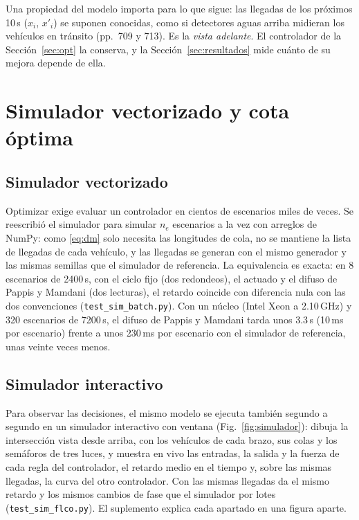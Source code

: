 \documentclass[journal]{IEEEtran}
\begin{document}
Una propiedad del modelo importa para lo que sigue: las llegadas de los próximos 10\,s ($x_i$, $x'_i$) se suponen conocidas, como si detectores aguas arriba midieran los vehículos en tránsito (pp.~709 y 713). Es la \emph{vista adelante}. El controlador de la Sección~\ref{sec:opt} la conserva, y la Sección~\ref{sec:resultados} mide cuánto de su mejora depende de ella.

\section{Simulador vectorizado y cota óptima}
\label{sec:simulador}

\subsection{Simulador vectorizado}
\label{sec:vectorizado}
Optimizar exige evaluar un controlador en cientos de escenarios miles de veces. Se reescribió el simulador para simular $n_e$ escenarios a la vez con arreglos de NumPy: como \eqref{eq:dm} solo necesita las longitudes de cola, no se mantiene la lista de llegadas de cada vehículo, y las llegadas se generan con el mismo generador y las mismas semillas que el simulador de referencia. La equivalencia es exacta: en 8 escenarios de 2400\,s, con el ciclo fijo (dos redondeos), el actuado y el difuso de Pappis y Mamdani (dos lecturas), el retardo coincide con diferencia nula con las dos convenciones (\texttt{test\_sim\_batch.py}). Con un núcleo (Intel Xeon a 2.10\,GHz) y 320 escenarios de 7200\,s, el difuso de Pappis y Mamdani tarda unos 3.3\,s (10\,ms por escenario) frente a unos 230\,ms por escenario con el simulador de referencia, unas veinte veces menos.


\subsection{Simulador interactivo}
\label{sec:interactivo}
Para observar las decisiones, el mismo modelo se ejecuta también segundo a segundo en un simulador interactivo con ventana (Fig.~\ref{fig:simulador}): dibuja la intersección vista desde arriba, con los vehículos de cada brazo, sus colas y los semáforos de tres luces, y muestra en vivo las entradas, la salida y la fuerza de cada regla del controlador, el retardo medio en el tiempo y, sobre las mismas llegadas, la curva del otro controlador. Con las mismas llegadas da el mismo retardo y los mismos cambios de fase que el simulador por lotes (\texttt{test\_sim\_flco.py}). El suplemento explica cada apartado en una figura aparte.
\end{document}
